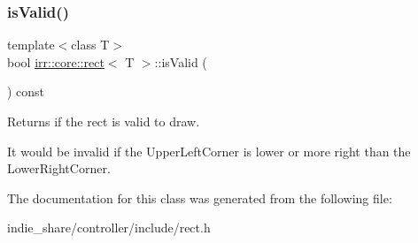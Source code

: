 \subsubsection{\texorpdfstring{is\+Valid()}{isValid()}}
{\footnotesize\ttfamily template$<$class T$>$ \\
bool \hyperlink{classirr_1_1core_1_1rect}{irr\+::core\+::rect}$<$ T $>$\+::is\+Valid (\begin{DoxyParamCaption}{ }\end{DoxyParamCaption}) const\hspace{0.3cm}{\ttfamily [inline]}}



Returns if the rect is valid to draw. 

It would be invalid if the Upper\+Left\+Corner is lower or more right than the Lower\+Right\+Corner. 

The documentation for this class was generated from the following file\+:\begin{DoxyCompactItemize}
\item 
indie\+\_\+share/controller/include/rect.\+h\end{DoxyCompactItemize}
